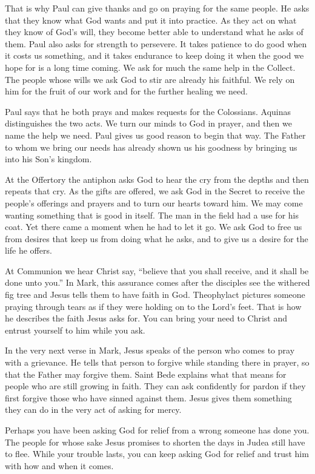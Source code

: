 That is why Paul can give thanks and go on praying for the same people. He
asks that they know what God wants and put it into practice. As they act on
what they know of God's will, they become better able to understand what he
asks of them. Paul also asks for strength to persevere. It takes
patience to do good when it costs us something, and it takes endurance to
keep doing it when the good we hope for is a long time coming. We ask for
much the same help in the Collect. The people whose wills we ask God to stir
are already his faithful. We rely on him for the fruit of our work and for
the further healing we need.

Paul says that he both prays and makes requests for the Colossians. Aquinas
distinguishes the two acts. We turn our minds to God in prayer, and then we
name the help we need. Paul gives us good reason to begin that way. The
Father to whom we bring our needs has already shown us his goodness by
bringing us into his Son's kingdom.

At the Offertory the antiphon asks God to hear the cry from the depths and
then repeats that cry. As the gifts are offered, we ask God in the Secret
to receive the people's offerings and prayers and to turn our hearts toward
him. We may come wanting something that is good in itself. The man in the
field had a use for his coat. Yet there came a moment
when he had to let it go. We ask God to free us from desires that keep us
from doing what he asks, and to give us a desire for the life he offers.

At Communion we hear Christ say, ``believe that you shall receive, and it
shall be done unto you.'' In Mark, this assurance comes after the disciples
see the withered fig tree and Jesus tells them to have faith in God.
Theophylact pictures someone praying through tears as
if they were holding on to the Lord's feet. That is how he describes the
faith Jesus asks for. You can bring your need to Christ and entrust yourself
to him while you ask.

In the very next verse in Mark, Jesus speaks of the person who comes to pray
with a grievance. He tells that person to forgive while standing there in
prayer, so that the Father may forgive them. Saint Bede explains what that
means for people who are still growing in faith. They can ask confidently
for pardon if they first forgive those who have sinned against them. Jesus gives
them something they can do in the very act of asking for mercy.

Perhaps you have been asking God for relief from a wrong someone has done
you. The people for whose sake Jesus promises to shorten the days in Judea
still have to flee. While your trouble lasts, you can keep asking God for
relief and trust him with how and when it comes.

